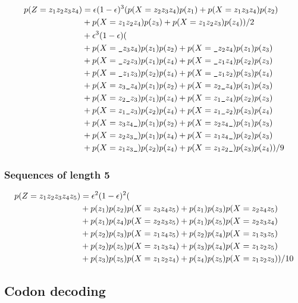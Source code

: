 \begin{equation*}
  \begin{split}
    p(Z=z_1z_2z_3z_4) &= \e(1-\e)^3 (p(X=z_2z_3z_4)p(z_1)+p(X=z_1z_3z_4)p(z_2)\\
        &+p(X=z_1z_2z_4)p(z_3)+p(X=z_1z_2z_3)p(z_4))/2\\
        &+\e^3(1-\e)(\\
        &+ p(X=\s z_3z_4)p(z_1)p(z_2) + p(X=\s z_2z_4)p(z_1)p(z_3)\\
        &+ p(X=\s z_2z_3)p(z_1)p(z_4) + p(X=\s z_1z_4)p(z_2)p(z_3)\\
        &+ p(X=\s z_1z_3)p(z_2)p(z_4) + p(X=\s z_1z_2)p(z_3)p(z_4)\\
        &+ p(X=z_3\s z_4)p(z_1)p(z_2) + p(X=z_2\s z_4)p(z_1)p(z_3)\\
        &+ p(X=z_2\s z_3)p(z_1)p(z_4) + p(X=z_1\s z_4)p(z_2)p(z_3)\\
        &+ p(X=z_1\s z_3)p(z_2)p(z_4) + p(X=z_1\s z_2)p(z_3)p(z_4)\\
        &+ p(X=z_3z_4\s)p(z_1)p(z_2) + p(X=z_2z_4\s)p(z_1)p(z_3)\\
        &+ p(X=z_2z_3\s)p(z_1)p(z_4) + p(X=z_1z_4\s)p(z_2)p(z_3)\\
        &+ p(X=z_1z_3\s)p(z_2)p(z_4) + p(X=z_1z_2\s)p(z_3)p(z_4))/9
  \end{split}
\end{equation*}

\subsubsection{Sequences of length 5}

\begin{equation*}
  \begin{split}
    p(Z=z_1z_2z_3z_4z_5)
        &= \epsilon^2(1-\epsilon)^2(\\
        &+p(z_1)p(z_2)p(X=z_3z_4z_5)+p(z_1)p(z_3)p(X=z_2z_4z_5)\\
        &+p(z_1)p(z_4)p(X=z_2z_3z_5)+p(z_1)p(z_5)p(X=z_2z_3z_4)\\
        &+p(z_2)p(z_3)p(X=z_1z_4z_5)+p(z_2)p(z_4)p(X=z_1z_3z_5)\\
        &+p(z_2)p(z_5)p(X=z_1z_3z_4)+p(z_3)p(z_4)p(X=z_1z_2z_5)\\
        &+p(z_3)p(z_5)p(X=z_1z_2z_4)+p(z_4)p(z_5)p(X=z_1z_2z_3))/10
  \end{split}
\end{equation*}

\subsection{Codon decoding}

